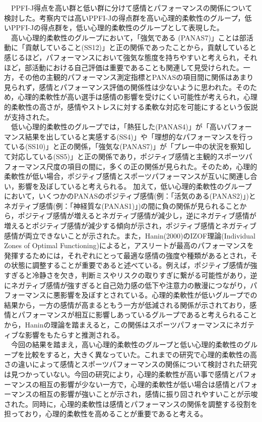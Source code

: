 \documentclass[12pt,a4paper,xelatex,ja=standard]{bxjsarticle}
\begin{document}
　PPFI-J得点を高い群と低い群に分けて感情とパフォーマンスの関係について検討した。考察内では高いPPFI-Jの得点群を高い心理的柔軟性のグループ，低いPPFI-Jの得点群を，低い心理的柔軟性のグループとして表現した。\\
　高い心理的柔軟性のグループにおいて，「強気である
(PANAS7)」ことは部活動に「貢献していること(SS12)」と正の関係であったことから，貢献していると感じるほど，パフォーマンスにおいて強気な態度を持ちやすいと考えられ，それほど，部活動における自己評価は重要であることも関連して見受けられた。一方，その他の主観的パフォーマンス測定指標とPANASの項目間に関係はあまり見られず，感情とパフォーマンス評価の関係性は少ないように思われた。そのため，心理的柔軟性が高い選手は感情の影響を受けにくい可能性が考えられ，心理的柔軟性の高さが，感情やストレスに対する柔軟な対応を可能にするという仮説が支持された。\\
　低い心理的柔軟性のグループでは，「熱狂した(PANAS4)」が「高いパフォーマンス結果を出していると実感する(SS4)」や「理想的なパフォーマンスを行っている(SS10)」と正の関係，「強気な(PANAS7)」が「プレー中の状況を察知して対応している(SS5)」と正の関係であり，ポジティブ感情と主観的スポーツパフォーマンス尺度の項目の間に，多くの正の関係が見られた。そのため，心理的柔軟性が低い場合，ポジティブ感情とスポーツパフォーマンスが互いに関連し合い，影響を及ぼしていると考えられる。
加えて，低い心理的柔軟性のグループにおいて，いくつかのPANASのポジティブ感情(例：「活気のある(PANAS2)」)とネガティブ感情(例：「神経質な(PANAS1)」)の間に負の関係が見られることから，ポジティブ感情が増えるとネガティブ感情が減少し，逆にネガティブ感情が増えるとポジティブ感情が減少する傾向が示され，ポジティブ感情とネガティブ感情が両立できないことが示された。また，Hanin(2000)のIZOF理論(Individual
Zones of Optimal
Functioning)によると，アスリートが最高のパフォーマンスを発揮するためには，それぞれにとって最適な感情の強度や種類があるとされ，その状態に調整することが重要であると述べている。例えば，ポジティブ感情が強すぎると冷静さを欠き，判断ミスやリスクの取りすぎに繋がる可能性があり，逆にネガティブ感情が強すぎると自己効力感の低下や注意力の散漫につながり，パフォーマンスに悪影響を及ぼすとされている。心理的柔軟性が低いグループでの結果から，一方の感情が高まるともう一方が低減される関係が示されており，感情とパフォーマンスが相互に影響しあっているグループであると考えられることから，Haninの理論を踏まえると，この関係はスポーツパフォーマンスにネガティブな影響をもたらすと推測される。\\
　今回の結果を踏まえ，高い心理的柔軟性のグループと低い心理的柔軟性のグループを比較をすると，大きく異なっていた。これまでの研究で心理的柔軟性の高さの違いによって感情とスポーツパフォーマンスの関係について検討された研究は見つかっていない。今回の研究により，心理的柔軟性が高い事で感情とパフォーマンスの相互の影響が少ない一方で，心理的柔軟性が低い場合は感情とパフォーマンスの相互の影響が強いことが示され，感情に振り回されやすいことが示唆された。同時に，心理的柔軟性は感情とパフォーマンスの関係を調整する役割を担っており，心理的柔軟性を高めることが重要であると考える。
　
\end{document}
